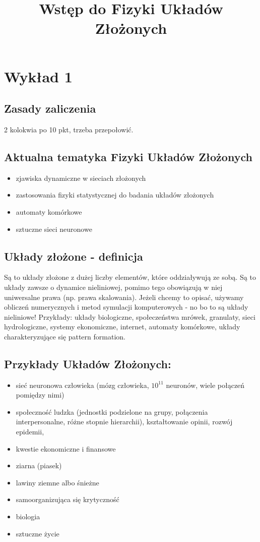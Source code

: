\documentclass{article}
\title{Wstęp do Fizyki Układów Złożonych}
\begin{document}
	\maketitle
	\newpage
	\section{Wykład 1}
		\subsection{Zasady zaliczenia}
		2 kolokwia po 10 pkt, trzeba przepołowić.
		\subsection{Aktualna tematyka Fizyki Układów Złożonych}
		\begin{itemize}
			\item zjawiska dynamiczne w sieciach złożonych
			\item zastosowania fizyki statystycznej do badania układów złożonych
			\item automaty komórkowe
			\item sztuczne sieci neuronowe
		\end{itemize}
		\subsection{Układy złożone - definicja}
		Są to układy złożone z dużej liczby elementów, które oddziaływują ze sobą. Są to układy zawsze o dynamice nieliniowej, pomimo tego obowiązują w niej uniwersalne prawa (np. prawa skalowania). Jeżeli chcemy to opisać, używamy obliczeń numerycznych i metod symulacji komputerowych - no bo to są układy nieliniowe! Przykłady: układy biologiczne, społeczeństwa mrówek, granulaty, sieci hydrologiczne, systemy ekonomiczne, internet, automaty komórkowe, układy charakteryzujące się pattern formation. 
		
		\subsection{Przykłady Układów Złożonych:}
		\begin{itemize}
			\item sieć neuronowa człowieka (mózg człowieka, $10^11$ neuronów, wiele połączeń pomiędzy nimi)
			\item społeczność ludzka (jednostki podzielone na grupy, połączenia interpersonalne, różne stopnie hierarchii), kształtowanie opinii, rozwój epidemii,  
			\item kwestie ekonomiczne i finansowe
			\item ziarna (piasek) \item lawiny ziemne albo śnieżne \item samoorganizująca się krytyczność
			\item biologia \item sztuczne życie
		\end{itemize}
	
\end{document}
